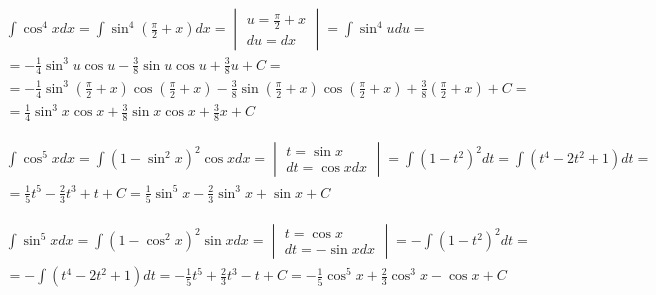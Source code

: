 

\begin{gather*}\int \cos^4 x dx = \int \sin^4 (\frac{\pi}{2}+x)dx = \begin{vmatrix} u=\frac{\pi}{2}+x \\ du=dx \end{vmatrix} = \int \sin^4 u du =  \\
= -\frac{1}{4}\sin^3 u \cos u - \frac{3}{8}\sin u \cos u + \frac{3}{8}u + C =  \\
= -\frac{1}{4}\sin^3 (\frac{\pi}{2}+x) \cos (\frac{\pi}{2}+x) - \frac{3}{8}\sin (\frac{\pi}{2}+x) \cos (\frac{\pi}{2}+x) + \frac{3}{8}(\frac{\pi}{2}+x) + C =  \\
= \frac{1}{4}\sin^3 x \cos x + \frac{3}{8}\sin x \cos x + \frac{3}{8}x + C\end{gather*}



\begin{gather*}
  \int \cos^5 x dx
  = \int (1-\sin^2x)^2\cos x dx =
  \begin{vmatrix}
    t=\sin x \\
    dt=\cos x dx
  \end{vmatrix}
  = \int (1-t^2)^2dt
  = \int (t^4-2t^2+1)dt = \\
  = \frac{1}{5}t^5-\frac{2}{3}t^3+t+C = \frac{1}{5}\sin^5 x-\frac{2}{3}\sin^3 x+\sin x+C
\end{gather*}



\begin{gather*}\int \sin^5 x dx = \int (1-\cos^2x)^2\sin x dx = \begin{vmatrix} t=\cos x \\ dt=-\sin x dx \end{vmatrix} = -\int (1-t^2)^2dt =  \\
= -\int (t^4-2t^2+1)dt = -\frac{1}{5}t^5+\frac{2}{3}t^3-t+C = -\frac{1}{5}\cos^5 x+\frac{2}{3}\cos^3 x-\cos x+C\end{gather*}


